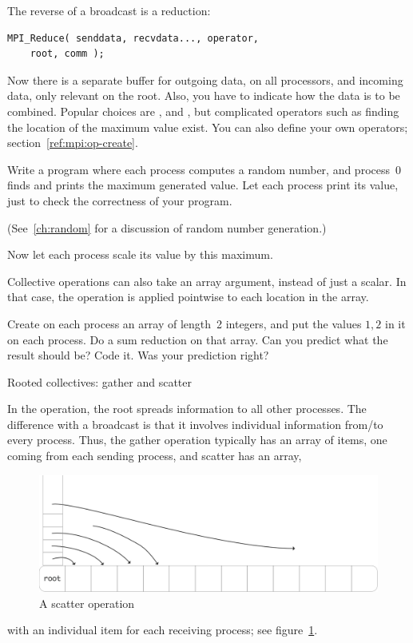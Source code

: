 The reverse of a broadcast is a reduction:
\begin{verbatim}
MPI_Reduce( senddata, recvdata..., operator,
    root, comm ); 
\end{verbatim}
Now there is a separate buffer for outgoing data, on all processors,
and incoming data, only relevant on the root. Also, you have to
indicate how the data is to be combined. Popular choices are
,  and
, but complicated operators such as finding the
location of the maximum value exist. You can also define your own
operators; section~\ref{ref:mpi:op-create}.

\begin{exercise}
  \label{ex:randommax}
  Write a program where each process computes a random number, and process~0
  finds and prints the maximum generated value. Let each process print its value,
  just to check the correctness of your program.
\begin{book}
  (See~\ref{ch:random} for a discussion of random number generation.)
\end{book}

  Now let each process scale its value by this maximum.
\end{exercise}


Collective operations can also take an array argument, instead of just a scalar.
In that case, the operation is applied pointwise to each location in the array.

\begin{exercise}
  \label{ex:randomcoord}
  Create on each process an array of length~2 integers, and put the values $1,2$
  in it on each process. Do a sum reduction on that array. Can you predict what the result should be?
  Code it. Was your prediction right?
\end{exercise}

 {Rooted collectives: gather and scatter}

In the  operation, the root spreads information to
all other processes. The difference with a broadcast is that it involves
individual information from/to every process. Thus, the gather operation typically 
has an array of items, one coming from each sending process, and scatter has an array,
\begin{figure}[ht]
  \includegraphics[scale=.12]{graphics/scatter-simple}
  \caption{A scatter operation}
  \label{fig:scatter}
\end{figure}
with an individual item for each receiving process; see figure~\ref{fig:scatter}.

